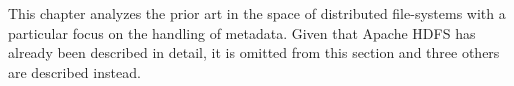 This chapter analyzes the prior art in the space of distributed file-systems with a particular focus on the handling of metadata.
Given that Apache HDFS has already been described in detail, it is omitted from this section and three others are described instead.

